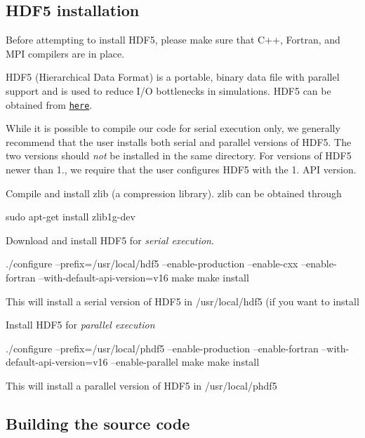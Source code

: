 \subsection*{H\+D\+F5 installation }

Before attempting to install H\+D\+F5, please make sure that C++, Fortran, and M\+PI compilers are in place.

H\+D\+F5 (Hierarchical Data Format) is a portable, binary data file with parallel support and is used to reduce I/O bottlenecks in simulations. H\+D\+F5 can be obtained from \href{https://support.hdfgroup.org/HDF5/}{\tt here}.

While it is possible to compile our code for serial execution only, we generally recommend that the user installs both serial and parallel versions of H\+D\+F5. The two versions should {\itshape not} be installed in the same directory. For versions of H\+D\+F5 newer than 1., we require that the user configures H\+D\+F5 with the 1. A\+PI version.


\begin{DoxyEnumerate}
\item Compile and install zlib (a compression library). zlib can be obtained through \begin{DoxyVerb} sudo apt-get install zlib1g-dev
\end{DoxyVerb}

\item Download and install H\+D\+F5 for {\itshape serial execution}. \begin{DoxyVerb} ./configure --prefix=/usr/local/hdf5 --enable-production --enable-cxx --enable-fortran --with-default-api-version=v16
 make
 make install
\end{DoxyVerb}


This will install a serial version of H\+D\+F5 in /usr/local/hdf5 (if you want to install
\item Install H\+D\+F5 for {\itshape parallel execution} \begin{DoxyVerb} ./configure --prefix=/usr/local/phdf5 --enable-production --enable-fortran --with-default-api-version=v16 --enable-parallel
 make
 make install
\end{DoxyVerb}


This will install a parallel version of H\+D\+F5 in /usr/local/phdf5
\end{DoxyEnumerate}

\subsection*{Building the source code }

